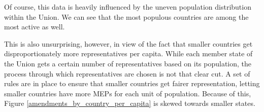 \documentclass[lettersize,journal]{IEEEtran}
\begin{document}
Of course, this data is heavily influenced by the uneven population distribution within the Union. We can see that the most populous countries are among the most active as well.


This is also unsurprising, however, in view of the fact that smaller countries get disproportionately more representatives per capita. While each member state of the Union gets a certain number of representatives based on its population, the process through which representatives are chosen is not that clear cut. A set of rules are in place to ensure that smaller countries get fairer representation, letting smaller countries have more MEPs for each unit of population. Because of this, Figure \ref{amendments_by_country_per_capita} is skewed towards smaller states.


\end{document}

